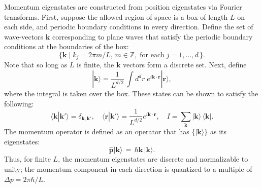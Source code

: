 \documentclass[pra,12pt]{revtex4}
\begin{document}
Momentum eigenstates are constructed from position eigenstates via
Fourier transforms.  First, suppose the allowed region of space is a
box of length $L$ on each side, and periodic boundary conditions in
every direction.  Define the set of wave-vectors $\mathbf{k}$
corresponding to plane waves that satisfy the periodic boundary
conditions at the boundaries of the box:
\begin{equation*}
  \Big\{\mathbf{k}  \; \Big| \; k_j = 2\pi m/L, \,m\in\mathbb{Z}, \;\text{for each} \; j = 1, \dots,d\, \Big\}.
\end{equation*}
Note that so long as $L$ is finite, the $\mathbf{k}$ vectors form a
discrete set.  Next, define
\begin{equation}
  |\mathbf{k}\rangle = \frac{1}{L^{d/2}} \, \int d^dr \; e^{i\mathbf{k}\cdot\mathbf{r}} |\mathbf{r}\rangle,
\end{equation}
where the integral is taken over the box.  These states
can be shown to satisfy the following:
\begin{equation}
  \langle\mathbf{k}|\mathbf{k}'\rangle = \delta_{\mathbf{k},\mathbf{k}'}, \quad \langle\mathbf{r}|\mathbf{k}'\rangle = \frac{1}{L^{d/2}} e^{i\mathbf{k}\cdot\mathbf{r}}, \quad I = \sum_{\mathbf{k}} |\mathbf{k}\rangle\,\langle\mathbf{k}|.
\end{equation}
The momentum operator is defined as an operator that has
$\{|\mathbf{k}\rangle\}$ as its eigenstates:
\begin{equation}
  \hat{\mathbf{p}} |\mathbf{k}\rangle \,=\, \hbar \mathbf{k}\, |\mathbf{k}\rangle.
\end{equation}
Thus, for finite $L$, the momentum eigenstates are discrete and
normalizable to unity; the momentum component in each direction is
quantized to a multiple of $\Delta p = 2\pi\hbar/L$.
\end{document}
